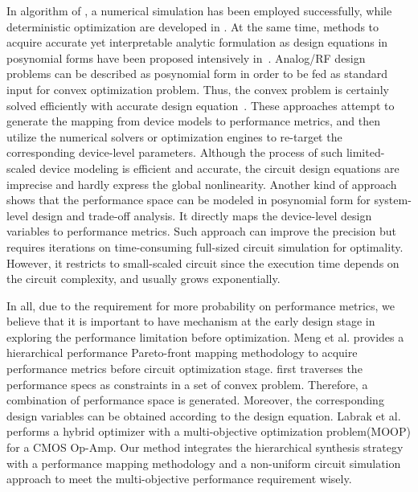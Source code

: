         In algorithm of \cite{Simu_DATE2000}, a numerical simulation has been employed successfully, while deterministic optimization are developed in \cite{MARS_TCAD2012,Habal_TCAD2011}. At the same time, methods to acquire accurate yet interpretable analytic formulation as design equations in posynomial forms have been proposed intensively in~\cite{PWL_Convex_GP,Eeckelaert_DATE2003}. Analog/RF design problems can be described as posynomial form in order to be fed as standard input for convex optimization problem. Thus, the convex problem is certainly solved efficiently with accurate design equation~\cite{Device_CKT_CoOpt_GP}. These approaches attempt to generate the mapping from device models to performance metrics, and then utilize the numerical solvers or optimization engines to re-target the corresponding device-level parameters. Although the process of such limited-scaled device modeling is efficient and accurate, the circuit design equations are imprecise and hardly express the global nonlinearity. Another kind of approach~\cite{RobustPosyMdl_ICCAD2004,PerfCentOpt_ICCAD2005} shows that the performance space can be modeled in posynomial form for system-level design and trade-off analysis. It directly maps the device-level design variables to performance metrics. Such approach can improve the precision but requires iterations on time-consuming full-sized circuit simulation for optimality. However, it restricts to small-scaled circuit since the execution time depends on the circuit complexity, and usually grows exponentially. 

        In all, due to the requirement for more probability on performance metrics, we believe that it is important to have mechanism at the early design stage in exploring the performance limitation before optimization. Meng et al.\cite{PerfMap_ISQED2011} provides a hierarchical performance Pareto-front mapping methodology to acquire performance metrics before circuit optimization stage. \cite{PerfMap_ISQED2011} first traverses the performance specs as constraints in a set of convex problem. Therefore, a combination of performance space is generated. Moreover, the corresponding design variables can be obtained according to the design equation. Labrak et al.~\cite{HybridOpt_MWSCAS2007} performs a hybrid optimizer with a multi-objective optimization problem(MOOP) for a CMOS Op-Amp. Our method integrates the hierarchical synthesis strategy with a performance mapping methodology and a non-uniform circuit simulation approach to meet the multi-objective performance requirement wisely. 

